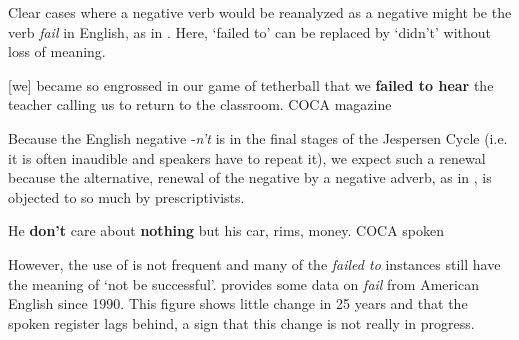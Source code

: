 ﻿\documentclass[output=paper]{langsci/langscibook}
\begin{document}
Clear cases where a negative verb would be reanalyzed as a negative might
be the verb \textit{fail} in English, as in .
Here, `failed to' can be replaced by `didn't' without loss of meaning.
%
\begin{exe}\ex \label{ex:other-english-fail}
      [we] became so engrossed in our game of tetherball that we
      \textbf{failed to hear} the teacher calling us to return to the classroom. {\ob}COCA magazine{\cb}
    \end{exe}
%
Because the English negative -\textit{n't} is in the final stages of the
Jespersen Cycle (i.e. it is often inaudible and speakers have to repeat
it), we expect such a renewal because the alternative, renewal of the
negative by a negative adverb, as in , is objected to so
much by prescriptivists. 
%
\begin{exe}\ex \label{ex:other-english-care}
      He \textbf{don't} care about \textbf{nothing} but his car, rims,
      money. {\ob}COCA spoken{\cb} 
      \end{exe}
%
However, the use of  is not frequent and many of
the \textit{failed to} instances still have the meaning of `not be
successful'.  provides some data on \textit{fail} from
American English since 1990. This figure shows little change in 25 years
and that the spoken register lags behind, a sign that this change is not
really in progress.%
%
%
\end{document}
